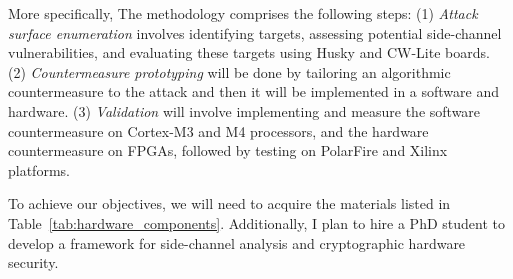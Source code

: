 More specifically, The methodology comprises the following steps:
(1) \textit{Attack surface enumeration} involves identifying targets, assessing potential 
side-channel vulnerabilities, and evaluating these targets 
using Husky and CW-Lite boards.
(2) \textit{Countermeasure prototyping} will be done by tailoring an algorithmic countermeasure to the 
attack and then it will be implemented in a software and hardware. 
(3) \textit{Validation} will involve implementing and measure the software countermeasure on 
Cortex-M3 and M4 processors, and the hardware countermeasure on FPGAs, 
followed by testing on PolarFire and Xilinx platforms.

To achieve our objectives, we will need to acquire the materials 
listed in Table~\ref{tab:hardware_components}. Additionally, I 
plan to hire a PhD student to develop a framework for side-channel 
analysis and cryptographic hardware security.



\begin{center}
\end{center}
